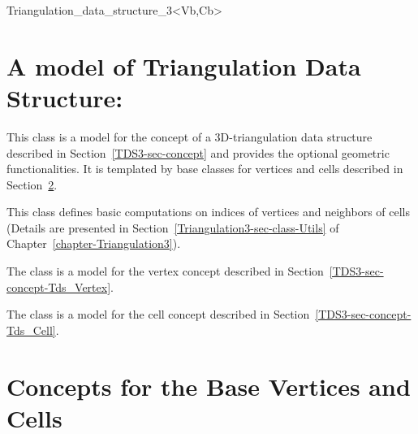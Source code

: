 \begin{ccClassTemplate}{Triangulation_data_structure_3<Vb,Cb>}
\section{A model of Triangulation Data Structure:\\ 
\protect {} }
\label{TDS3-sec-class}

This class is a model for the concept of a 3D-triangulation data structure
described in Section~\ref{TDS3-sec-concept} and provides the optional
geometric functionalities. It is templated by base classes for
vertices and cells described in Section~\ref{TDS3-sec-concept-Base}.

This class defines basic computations on indices of vertices and
neighbors of cells (Details are presented in
Section~\ref{Triangulation3-sec-class-Utils} of
Chapter~\ref{chapter-Triangulation3}).


The class  is a model for the vertex
concept described in Section~\ref{TDS3-sec-concept-Tds_Vertex}.


The class  is a model for the
cell concept described in Section~\ref{TDS3-sec-concept-Tds_Cell}.


	\end{ccClassTemplate} 

\section{Concepts for the Base Vertices and Cells}
\label{TDS3-sec-concept-Base}

